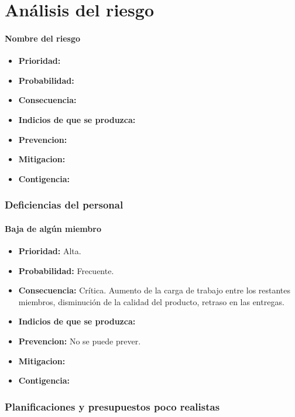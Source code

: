 \documentclass[spanish,a4paper,12pt]{report}	%
\begin{document}
\newpage
\mbox{}
\thispagestyle{empty}						%
\newpage

\part{Análisis del riesgo}

\subsection*{Nombre del riesgo}			%
	\begin{itemize}
		\item \textbf {Prioridad: }
		\item \textbf {Probabilidad: }
		\item \textbf {Consecuencia: }
		\item \textbf {Indicios de que se produzca: }
		\item \textbf {Prevencion: }
		\item \textbf {Mitigacion: }
		\item \textbf {Contigencia: }
	\end{itemize}


\section{Deficiencias del personal}
%
\subsection*{Baja de algún miembro}			%
	\begin{itemize}
		\item \textbf {Prioridad: }Alta.
		\item \textbf {Probabilidad: }Frecuente.
		\item \textbf {Consecuencia: }Crítica. Aumento de la carga de trabajo entre los restantes miembros, disminución de la calidad del producto, retraso en las entregas.
		\item \textbf {Indicios de que se produzca: }
		\item \textbf {Prevencion: }No se puede prever.
		\item \textbf {Mitigacion: }
		\item \textbf {Contigencia: }
	\end{itemize}

%
\section{Planificaciones y presupuestos poco realistas}
\end{document}
